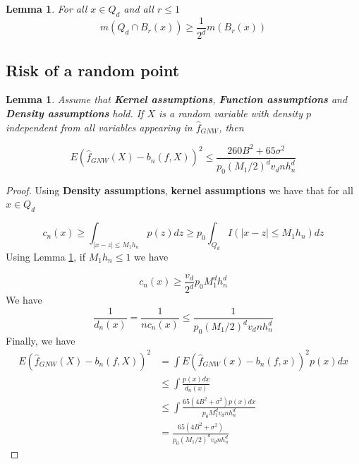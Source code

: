 \documentclass{article}
\newtheorem{lemma}[theorem]{Lemma}
\begin{document}
\begin{lemma}
\label{measure_retention_lemma}
For all $x\in Q_d$ and all $r\leq 1$ 
\begin{equation}
    m(Q_d\cap B_r(x))\geq \frac{1}{2^d}m(B_r(x))
\end{equation}
\end{lemma}

\subsection{Risk of a random point}

\begin{lemma}
\label{risk_at_random_point}
Assume that \textbf{Kernel assumptions}, \textbf{Function assumptions} and
\textbf{Density assumptions} hold. If $X$ is a random variable with density $p$ independent from all variables appearing in $\hat{f}_{GNW}$, then 

\begin{equation*}
    E(\hat{f}_{GNW}(X)-b_n(f,X))^2\leq \frac{260B^2+65\sigma^2}{p_0(M_1/2)^dv_dnh_n^d}
\end{equation*}
\end{lemma}

\begin{proof}
Using \textbf{Density assumptions}, \textbf{kernel assumptions} we have that for all $x\in Q_d$

\begin{equation}
    c_n(x)\geq \int_{|x-z|\leq M_1h_n}p(z)dz\geq p_0 \int_{Q_d} I(|x-z|\leq M_1h_n)dz
\end{equation}
Using Lemma \ref{measure_retention_lemma}, if $M_1h_n\leq 1$ we have

\begin{equation*}
    c_n(x)\geq \frac{v_d}{2^d}p_0M_1^dh_n^d
\end{equation*}
We have 
\begin{equation*}
    \frac{1}{d_n(x)}=\frac{1}{nc_n(x)}\leq \frac{1}{p_0(M_1/2)^dv_dnh_n^d}
\end{equation*}
Finally, we have
\begin{equation}
\begin{split}
    E(\hat{f}_{GNW}(X)-b_n(f,X))^2&=\int E(\hat{f}_{GNW}(x)-b_n(f,x))^2p(x)dx\\
    &\leq \int \frac{p(x)dx}{d_n(x)}\\
    &\leq \int \frac{65(4B^2+\sigma^2)p(x)dx}{p_0M_1^dv_dnh_n^d}\\
    &=\frac{65(4B^2+\sigma^2)}{p_0(M_1/2)^dv_dnh_n^d}
\end{split}
\end{equation}
\end{proof}
\end{document}
